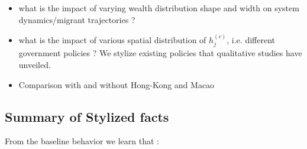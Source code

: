 \begin{itemize}
\item what is the impact of varying wealth distribution shape and width on system dynamics/migrant trajectories ?
\item what is the impact of various spatial distribution of $h_j^{(c)}$, i.e. different government policies ? We stylize existing policies that qualitative studies have unveiled.
\item Comparison with and without Hong-Kong and Macao 
\end{itemize}




\subsection{Summary of Stylized facts}

From the baseline behavior we learn that :

